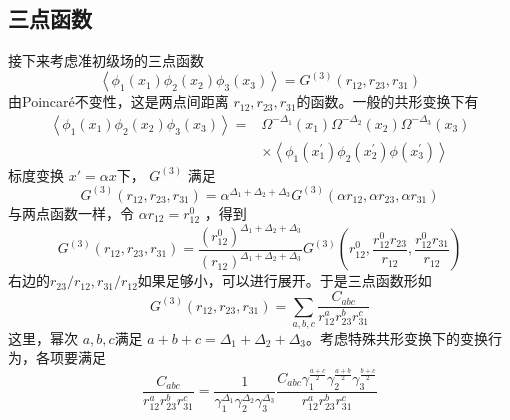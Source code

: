\subsection{三点函数}
接下来考虑准初级场的三点函数
\begin{equation}
	\left\langle\phi_{1}\left(x_{1}\right) \phi_{2}\left(x_{2}\right) \phi_{3}\left(x_{3}\right)\right\rangle=G^{(3)}\left(r_{12}, r_{23}, r_{31}\right)
\end{equation}
由Poincaré不变性，这是两点间距离 $r_{12},r_{23},r_{31} $的函数。一般的共形变换下有
\begin{equation}
	\begin{aligned} \left\langle\phi_{1}\left(x_{1}\right) \phi_{2}\left(x_{2}\right) \phi_{3}\left(x_{3}\right)\right\rangle=& \Omega^{-\Delta_{1}}\left(x_{1}\right) \Omega^{-\Delta_{2}}\left(x_{2}\right) \Omega^{-\Delta_{3}}\left(x_{3}\right) \\ & \times\left\langle\phi_{1}\left(x_{1}^{\prime}\right) \phi_{2}\left(x_{2}^{\prime}\right) \phi\left(x_{3}^{\prime}\right)\right\rangle \end{aligned}
\end{equation}
标度变换 $x'=\alpha x $下， $G^{(3)}$ 满足
\begin{equation}
	G^{(3)}\left(r_{12}, r_{23}, r_{31}\right)=\alpha^{\Delta_{1}+\Delta_{2}+\Delta_{3}} G^{(3)}\left(\alpha r_{12}, \alpha r_{23}, \alpha r_{31}\right)
\end{equation}
与两点函数一样，令 $\alpha r_{12}=r^0_{12}$ ，得到
\begin{equation}
	G^{(3)}\left(r_{12}, r_{23}, r_{31}\right)=\frac{\left(r_{12}^{0}\right)^{\Delta_{1}+\Delta_{2}+\Delta_{3}}}{\left(r_{12}\right)^{\Delta_{1}+\Delta_{2}+\Delta_{3}}} G^{(3)}\left(r_{12}^{0}, \frac{r_{12}^{0} r_{23}}{r_{12}}, \frac{r_{12}^{0} r_{31}}{r_{12}}\right)
\end{equation}
右边的$ r_{23}/r_{12},r_{31}/r_{12} $如果足够小，可以进行展开。于是三点函数形如
\begin{equation}
	G^{(3)}\left(r_{12}, r_{23}, r_{31}\right)=\sum_{a, b, c} \frac{C_{a b c}}{r_{12}^{a} r_{23}^{b} r_{31}^{c}}
\end{equation}
这里，幂次 $a,b,c $满足 $a+b+c=\Delta_{1}+\Delta_{2}+\Delta_{3} $。考虑特殊共形变换下的变换行为，各项要满足
\begin{equation}
\frac{C_{a b c}}{r_{12}^{a} r_{23}^{b} r_{31}^{c}}=\frac{1}{\gamma_{1}^{\Delta_{1}} \gamma_{2}^{\Delta_{2}} \gamma_{3}^{\Delta_{3}}} \frac{C_{a b c} \gamma_{1}^{\frac{a+c}{2}} \gamma_{2}^{\frac{a+b}{2}} \gamma_{3}^{\frac{b+c}{2}}}{r_{12}^{a} r_{23}^{b} r_{31}^{c}}
\end{equation}\
